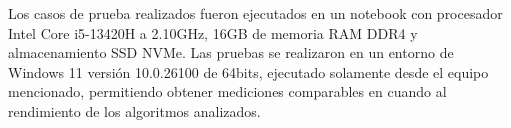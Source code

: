 Los casos de prueba realizados fueron ejecutados en un notebook con procesador Intel Core i5-13420H a 2.10GHz, 16GB de memoria RAM DDR4 y almacenamiento SSD NVMe. Las pruebas se realizaron en un entorno de Windows 11 versión 10.0.26100 de 64bits, ejecutado solamente desde el equipo mencionado, permitiendo obtener mediciones comparables en cuando al rendimiento de los algoritmos analizados.